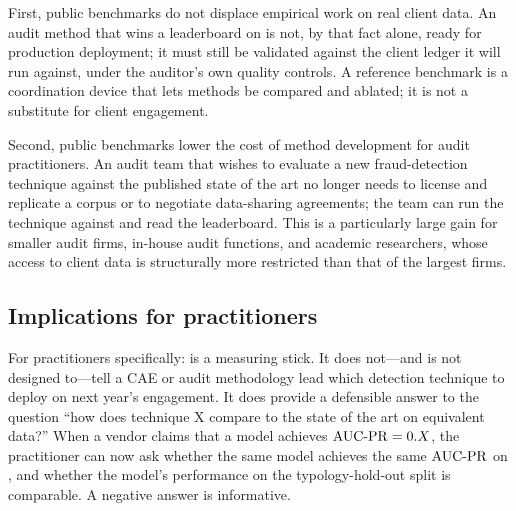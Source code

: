 First, public benchmarks do not displace empirical work on real
client data.  An audit method that wins a leaderboard on \bench{}
is not, by that fact alone, ready for production deployment; it
must still be validated against the client ledger it will run
against, under the auditor's own quality controls.  A reference
benchmark is a coordination device that lets methods be compared
and ablated; it is not a substitute for client engagement.

Second, public benchmarks lower the cost of method development for
audit practitioners.  An audit team that wishes to evaluate a new
fraud-detection technique against the published state of the art
no longer needs to license and replicate a corpus or to negotiate
data-sharing agreements; the team can run the technique against
\bench{} and read the leaderboard.  This is a particularly large
gain for smaller audit firms, in-house audit functions, and
academic researchers, whose access to client data is structurally
more restricted than that of the largest firms.

\subsection{Implications for practitioners}
\label{sec:discussion:implications}

For practitioners specifically: \bench{} is a measuring stick.
It does not---and is not designed to---tell a CAE or audit
methodology lead which detection technique to deploy on next
year's engagement.  It does provide a defensible answer to the
question ``how does technique X compare to the state of the art
on equivalent data?''  When a vendor claims that a model achieves
$\operatorname{AUC\text{-}PR} = 0.X$, the practitioner can now ask whether the same
model achieves the same $\operatorname{AUC\text{-}PR}$ on \bench{}, and whether the
model's performance on the typology-hold-out split is comparable.
A negative answer is informative.
